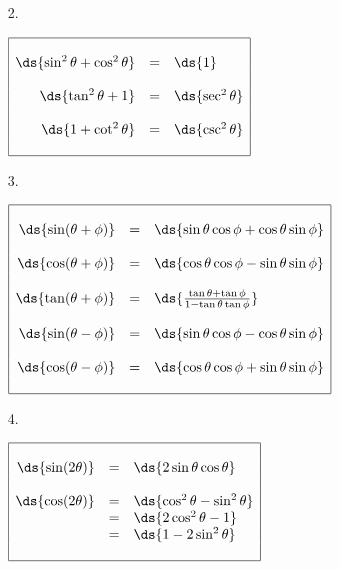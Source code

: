 \begin{multicols}{2}
\begin{enumerate}
\item[2.] 

$ \begin{array}{|rcl|} \hline	
&& \\
\ds{\sin ^2 \theta + \cos ^2 \theta} & = & \ds{1}\\
&& \\
\ds{\tan^2 \theta + 1} & = & \ds{\sec^2 \theta} \\
&& \\
\ds{1 + \cot ^2 \theta}  & = & \ds{\csc^2 \theta} \\
&& \\ \hline
\end{array} $

\vspace{5mm} 
\item[3.] 

$\begin{array}{|rcl|} \hline
&& \\	
\ds{\sin(\theta+\phi)} & = & \ds{\sin\theta\cos\phi + \cos\theta\sin\phi} \\
&& \\
\ds{\cos(\theta+\phi)} & = & \ds{\cos\theta\cos\phi - \sin\theta\sin\phi} \\
&& \\
\ds{\tan(\theta+\phi)} & = & \ds{\frac{\tan\theta + \tan\phi}{1 - \tan\theta\tan\phi}}\\
&& \\
\ds{\sin(\theta-\phi)} & = & \ds{\sin\theta\cos\phi - \cos\theta\sin\phi} \\
&& \\
\ds{\cos(\theta-\phi)} & = & \ds{\cos\theta\cos\phi + \sin\theta\sin\phi} \\
&& \\ \hline 
\end{array} $


\item[4.] 

$\begin{array}{|rcl|} \hline
&& \\	
\ds{\sin(2\theta)} & =  & \ds{2\sin\theta\cos\theta} \\
&& \\
\ds{\cos(2\theta)} & = & \ds{\cos^2\theta - \sin^2\theta}\\
& =  & \ds{2\cos^2\theta - 1} \\
& = & \ds{1-2\sin^2\theta}\\
&& \\ \hline 
\end{array}$


\end{enumerate}
\end{multicols}
